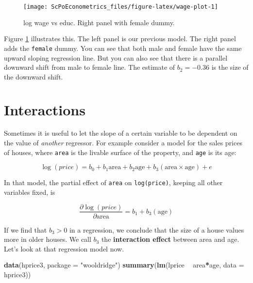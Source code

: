 \documentclass[]{book}
\newenvironment{Shaded}{\begin{snugshade}}{\end{snugshade}}
\newcommand{\KeywordTok}[1]{\textcolor[rgb]{0.13,0.29,0.53}{\textbf{#1}}}
\newcommand{\DataTypeTok}[1]{\textcolor[rgb]{0.13,0.29,0.53}{#1}}
\newcommand{\StringTok}[1]{\textcolor[rgb]{0.31,0.60,0.02}{#1}}
\newcommand{\OperatorTok}[1]{\textcolor[rgb]{0.81,0.36,0.00}{\textbf{#1}}}
\newcommand{\NormalTok}[1]{#1}
\begin{document}
\begin{figure}

{\centering \texttt{[image: ScPoEconometrics\_files/figure-latex/wage-plot-1]} 

}

\caption{log wage vs educ. Right panel with female dummy.}\label{fig:wage-plot}
\end{figure}

Figure \ref{fig:wage-plot} illustrates this. The left panel is our
previous model. The right panel adds the \texttt{female} dummy. You can
see that both male and female have the same upward sloping regression
line. But you can also see that there is a parallel downward shift from
male to female line. The estimate of \(b_2 = -0.36\) is the size of the
downward shift.

\section{Interactions}\label{interactions}

Sometimes it is useful to let the slope of a certain variable to be
dependent on the value of \emph{another} regressor. For example consider
a model for the sales prices of houses, where \texttt{area} is the
livable surface of the property, and \texttt{age} is its age:

\begin{equation}
\log(price) = b_0 + b_1 \text{area} + b_2 \text{age} + b_3 (\text{area} \times \text{age}) + e  \label{eq:price-interact}
\end{equation}

In that model, the partial effect of \texttt{area} on
\texttt{log(price)}, keeping all other variables fixed, is

\begin{equation}
\frac{\partial \log(price)}{\partial \text{area}} = b_1 + b_3 (\text{age}) 
\end{equation}

If we find that \(b_3 > 0\) in a regression, we conclude that the size
of a house values more in older houses. We call \(b_3\) the
\textbf{interaction effect} between area and age. Let's look at that
regression model now.

\begin{Shaded}
\begin{Highlighting}[]
\KeywordTok{data}\NormalTok{(hprice3, }\DataTypeTok{package =} \StringTok{"wooldridge"}\NormalTok{)}
\KeywordTok{summary}\NormalTok{(}\KeywordTok{lm}\NormalTok{(lprice }\OperatorTok{~}\StringTok{ }\NormalTok{area}\OperatorTok{*}\NormalTok{age, }\DataTypeTok{data =}\NormalTok{ hprice3))}
\end{Highlighting}
\end{Shaded}
\end{document}
